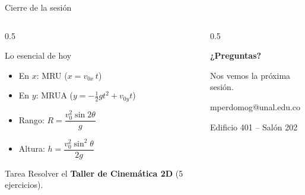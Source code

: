 \documentclass[aspectratio=169,xcolor=dvipsnames]{beamer}
\begin{document}
	\begin{frame}{Cierre de la sesión}
		\begin{columns}[T]
			\begin{column}{0.5\textwidth}
				\begin{block}{Lo esencial de hoy}
					\small
					\begin{itemize}
						\item En $x$: MRU \quad ($x = v_{0x}\,t$)
						\item En $y$: MRUA \quad ($y = -\tfrac{1}{2}gt^2 + v_{0y}t$)
						\item Rango: $R = \dfrac{v_0^2 \sin 2\theta}{g}$
						\item Altura: $h = \dfrac{v_0^2 \sin^2\theta}{2g}$
					\end{itemize}
				\end{block}
				
				\vspace{0.25cm}
				\begin{exampleblock}{Tarea}
					\small
					Resolver el \textbf{Taller de Cinemática 2D} (5 ejercicios).
				\end{exampleblock}
			\end{column}
			\begin{column}{0.5\textwidth}
				\begin{center}
					\vspace{0.3cm}
					\Large \textbf{¿Preguntas?}
					
					\vspace{0.8cm}
					\normalsize
					Nos vemos la próxima sesión.
					
					\vspace{0.6cm}
					mperdomog@unal.edu.co
					
					\vspace{0.2cm}
					Edificio 401 -- Salón 202
				\end{center}
			\end{column}
		\end{columns}
	\end{frame}
	
\end{document}
